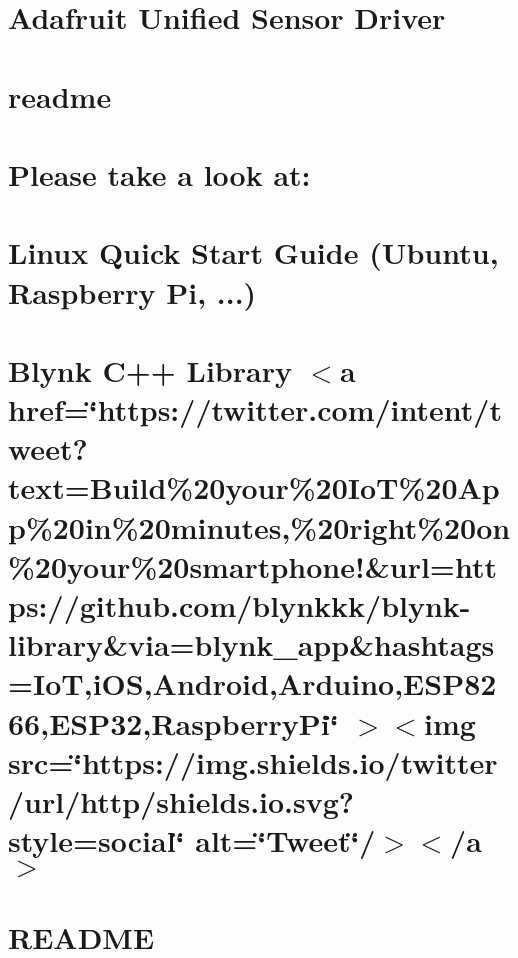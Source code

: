 \documentclass[twoside]{book}
\newcommand{\+}{\discretionary{\mbox{\scriptsize$\hookleftarrow$}}{}{}}
\begin{document}
\chapter{Adafruit Unified Sensor Driver}
\label{md_lib__adafruit__sensor__r_e_a_d_m_e}

\chapter{readme}
\label{md_lib__blynk_examples__getting_started__blynk_blink_readme}

\chapter{Please take a look at\+:}
\label{md_lib__blynk_extras_docs__r_e_a_d_m_e}

\chapter{Linux Quick Start Guide (Ubuntu, Raspberry Pi, ...)}
\label{md_lib__blynk_linux__r_e_a_d_m_e}

\chapter{Blynk C++ Library \texorpdfstring{$<$}{<}a href=\char`\"{}https\+://twitter.\+com/intent/tweet?text=\+Build\%20your\%20\+Io\+T\%20\+App\%20in\%20minutes,\%20right\%20on\%20your\%20smartphone!\&url=https\+://github.\+com/blynkkk/blynk-\/library\&via=blynk\+\_\+app\&hashtags=\+Io\+T,i\+OS,\+Android,\+Arduino,\+ESP8266,\+ESP32,\+Raspberry\+Pi\char`\"{} \texorpdfstring{$>$}{>}\texorpdfstring{$<$}{<}img src=\char`\"{}https\+://img.\+shields.\+io/twitter/url/http/shields.\+io.\+svg?style=social\char`\"{} alt=\char`\"{}\+Tweet\char`\"{}/\texorpdfstring{$>$}{>}\texorpdfstring{$<$}{<}/a\texorpdfstring{$>$}{>}}
\label{md_lib__blynk__r_e_a_d_m_e}

\chapter{README}
\label{md_lib__blynk_scripts__r_e_a_d_m_e}

\end{document}
